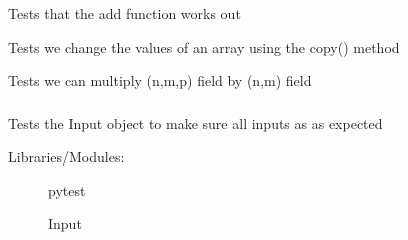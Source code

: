 \documentclass[letterpaper,10pt,english]{sphinxmanual}
\begin{document}
\begin{fulllineitems}
\label{\detokenize{autoapi/tests/test_Field/index:tests.test_Field.test_dimensional_mean}}
\sphinxAtStartPar
Tests that the add function works out

\end{fulllineitems}


\begin{fulllineitems}
\label{\detokenize{autoapi/tests/test_Field/index:tests.test_Field.test_copy}}
\sphinxAtStartPar
Tests we change the values of an array using the copy() method

\end{fulllineitems}


\begin{fulllineitems}
\label{\detokenize{autoapi/tests/test_Field/index:tests.test_Field.test_product_2d_3d}}
\sphinxAtStartPar
Tests we can multiply (n,m,p) field by (n,m) field

\end{fulllineitems}



\subsubsection{}
\label{\detokenize{autoapi/tests/test_Input/index:module-tests.test_Input}}\label{\detokenize{autoapi/tests/test_Input/index:tests-test-input}}\label{\detokenize{autoapi/tests/test_Input/index::doc}}
\sphinxAtStartPar
Tests the Input object to make sure all inputs as as expected
\begin{description}
\item[{Libraries/Modules:}] \leavevmode
\sphinxAtStartPar
pytest

\sphinxAtStartPar
Input

\end{description}
\end{document}
